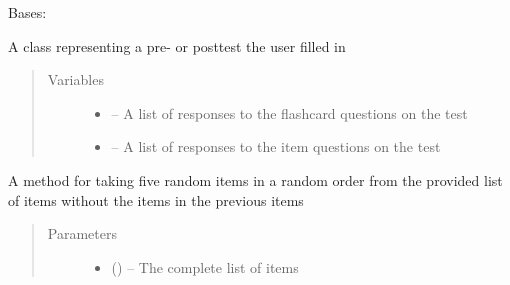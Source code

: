 \documentclass[letterpaper,10pt,english]{sphinxmanual}
\begin{document}
\begin{fulllineitems}
\label{\detokenize{test:test.Test}}
Bases: 

A class representing a pre- or posttest the user filled in
\begin{quote}\begin{description}
\item[{Variables}] \leavevmode\begin{itemize}
\item {} 
 -- A list of responses to the flashcard questions on the test

\item {} 
 -- A list of responses to the item questions on the test

\end{itemize}

\end{description}\end{quote}

\begin{fulllineitems}
\label{\detokenize{test:test.Test.generate_test}}
A method for taking five random items in a random order from the provided list of items without the items in the previous items
\begin{quote}\begin{description}
\item[{Parameters}] \leavevmode\begin{itemize}
\item {} 
 (\href{https://docs.python.org/2/library/functions.html\#list}{}\href{https://docs.python.org/2/library/functions.html\#list}{}\sphinxstyleliteralemphasis{)}\sphinxstyleliteralemphasis{}) -- The complete list of items


\end{itemize}
\end{description}
\end{quote}
\end{fulllineitems}
\end{fulllineitems}
\end{document}
